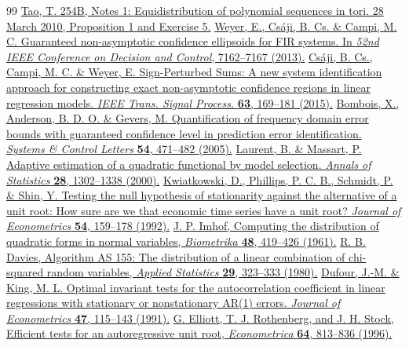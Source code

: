 \begin{thebibliography}{99}
 \href{https://terrytao.wordpress.com/2010/03/28/254b-notes-1-equidistribution-of-polynomial-sequences-in-torii/}{Tao, T. 254B, Notes 1: Equidistribution of polynomial sequences in tori. 28 March 2010, Proposition 1 and Exercise 5.}
 \href{https://doi.org/10.1109/CDC.2013.6761025}{Weyer, E., Cs\'aji, B. Cs. \& Campi, M. C. Guaranteed non-asymptotic confidence ellipsoids for FIR systems. In \emph{52nd IEEE Conference on Decision and Control}, 7162--7167 (2013).}
 \href{https://doi.org/10.1109/TSP.2014.2369000}{Cs\'aji, B. Cs., Campi, M. C. \& Weyer, E. Sign-Perturbed Sums: A new system identification approach for constructing exact non-asymptotic confidence regions in linear regression models. \emph{IEEE Trans. Signal Process.} \textbf{63}, 169--181 (2015).}
 \href{https://doi.org/10.1016/j.sysconle.2004.09.011}{Bombois, X., Anderson, B. D. O. \& Gevers, M. Quantification of frequency domain error bounds with guaranteed confidence level in prediction error identification. \emph{Systems \& Control Letters} \textbf{54}, 471--482 (2005).}
 \href{https://doi.org/10.1214/aos/1015957395}{Laurent, B. \& Massart, P. Adaptive estimation of a quadratic functional by model selection. \emph{Annals of Statistics} \textbf{28}, 1302--1338 (2000).}
 \href{https://doi.org/10.1016/0304-4076(92)90104-Y}{Kwiatkowski, D., Phillips, P. C. B., Schmidt, P. \& Shin, Y. Testing the null hypothesis of stationarity against the alternative of a unit root: How sure are we that economic time series have a unit root? \emph{Journal of Econometrics} \textbf{54}, 159--178 (1992).}
 \href{https://doi.org/10.1093/biomet/48.3-4.419}{J. P. Imhof, Computing the distribution of quadratic forms in normal variables, \emph{Biometrika} \textbf{48}, 419--426 (1961).}
 \href{https://doi.org/10.2307/2346911}{R. B. Davies, Algorithm AS 155: The distribution of a linear combination of chi-squared random variables, \emph{Applied Statistics} \textbf{29}, 323--333 (1980).}
 \href{https://doi.org/10.1016/0304-4076(91)90080-W}{Dufour, J.-M. \& King, M. L. Optimal invariant tests for the autocorrelation coefficient in linear regressions with stationary or nonstationary AR(1) errors. \emph{Journal of Econometrics} \textbf{47}, 115--143 (1991).}
 \href{https://doi.org/10.2307/2171846}{G. Elliott, T. J. Rothenberg, and J. H. Stock, Efficient tests for an autoregressive unit root, \emph{Econometrica} \textbf{64}, 813--836 (1996).}

\end{thebibliography}
